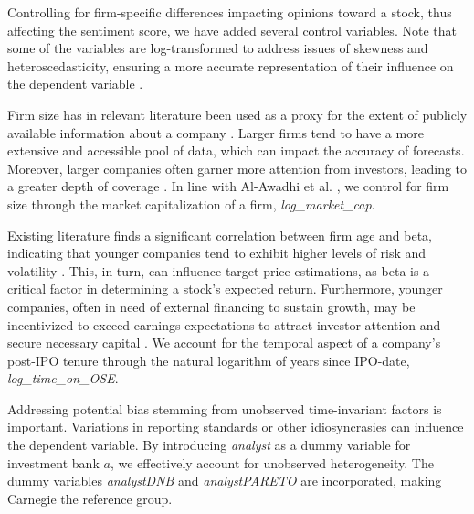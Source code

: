 
Controlling for firm-specific differences impacting opinions toward a stock, thus affecting the sentiment score, we have added several control variables. Note that some of the variables are log-transformed to address issues of skewness and heteroscedasticity, ensuring a more accurate representation of their influence on the dependent variable \parencite{virginiaInterpretingTransformations}.

Firm size has in relevant literature been used as a proxy for the extent of publicly available information about a company \parencite{das1998earnings}. Larger firms tend to have a more extensive and accessible pool of data, which can impact the accuracy of forecasts. Moreover, larger companies often garner more attention from investors, leading to a greater depth of coverage \parencite{fortin2007analyst}. In line with Al-Awadhi et al. \parencite*{al2020death}, we control for firm size through the market capitalization of a firm, \textit{log\_market\_cap}. 

Existing literature finds a significant correlation between firm age and beta, indicating that younger companies tend to exhibit higher levels of risk and volatility \parencite{chincarini2020beta}. This, in turn, can influence target price estimations, as beta is a critical factor in determining a stock's expected return. Furthermore, younger companies, often in need of external financing to sustain growth, may be incentivized to exceed earnings expectations to attract investor attention and secure necessary capital \parencite{coad2016innovation,loderer2010firm}. We account for the temporal aspect of a company's post-IPO tenure through the natural logarithm of years since IPO-date, \textit{log\_time\_on\_OSE}. %

Addressing potential bias stemming from unobserved time-invariant factors is important. Variations in reporting standards or other idiosyncrasies can influence the dependent variable. By introducing \textit{analyst} as a dummy variable for investment bank \(a\), %
we effectively account for unobserved heterogeneity. %
The dummy variables \textit{analystDNB} and \textit{analystPARETO} are incorporated, making Carnegie the reference group. 


